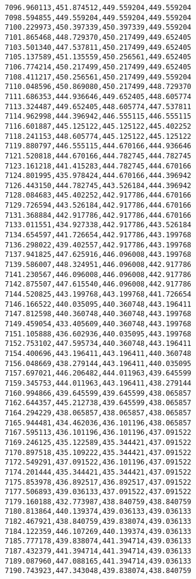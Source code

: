 \documentclass[11pt]{article}
\begin{document}
\begin{Verbatim}[commandchars=\\\{\}]
7096.960113,451.874512,449.559204,449.559204
7098.594855,449.559204,449.559204,449.559204
7100.229973,450.397339,450.397339,449.559204
7101.865468,448.729370,450.217499,449.652405
7103.501340,447.537811,450.217499,449.652405
7105.137589,451.135559,450.256561,449.652405
7106.774214,450.217499,450.217499,449.652405
7108.411217,450.256561,450.217499,449.559204
7110.048596,450.869080,450.217499,448.729370
7111.686353,444.936646,449.652405,448.605774
7113.324487,449.652405,448.605774,447.537811
7114.962998,444.396942,446.555115,446.555115
7116.601887,445.125122,445.125122,445.402252
7118.241153,448.605774,445.125122,445.125122
7119.880797,446.555115,444.670166,444.936646
7121.520818,444.670166,444.782745,444.782745
7123.161218,441.415283,444.782745,444.670166
7124.801995,435.978424,444.670166,444.396942
7126.443150,444.782745,443.526184,444.396942
7128.084683,445.402252,442.917786,444.670166
7129.726594,443.526184,442.917786,444.670166
7131.368884,442.917786,442.917786,444.670166
7133.011551,434.927338,442.917786,443.526184
7134.654597,441.726654,442.917786,443.199768
7136.298022,439.402557,442.917786,443.199768
7137.941825,447.625916,446.096008,443.199768
7139.586007,448.324951,446.096008,442.917786
7141.230567,446.096008,446.096008,442.917786
7142.875507,447.615540,446.096008,442.917786
7144.520825,443.199768,443.199768,441.726654
7146.166522,440.035095,440.360748,443.196411
7147.812598,440.360748,440.360748,443.199768
7149.459054,433.405609,440.360748,443.199768
7151.105888,436.602936,440.035095,443.199768
7152.753102,447.595734,440.360748,443.196411
7154.400696,443.196411,443.196411,440.360748
7156.048669,438.279144,443.196411,440.035095
7157.697021,446.206482,444.011963,439.645599
7159.345753,444.011963,443.196411,438.279144
7160.994866,439.645599,439.645599,438.065857
7162.644357,445.212738,439.645599,438.065857
7164.294229,438.065857,438.065857,438.065857
7165.944481,434.462036,436.101196,438.065857
7167.595113,436.101196,436.101196,437.091522
7169.246125,435.122589,435.344421,437.091522
7170.897518,435.109222,435.344421,437.091522
7172.549291,437.091522,436.101196,437.091522
7174.201444,435.344421,435.344421,437.091522
7175.853978,436.892517,436.892517,437.091522
7177.506893,439.036133,437.091522,437.091522
7179.160188,432.773987,438.840759,438.840759
7180.813864,440.139374,439.036133,439.036133
7182.467921,438.840759,439.838074,439.036133
7184.122359,446.107269,440.139374,439.036133
7185.777178,439.838074,441.394714,439.036133
7187.432379,441.394714,441.394714,439.036133
7189.087960,447.088165,441.394714,439.036133
7190.743923,447.343048,439.838074,438.840759

\end{Verbatim}
\end{document}
